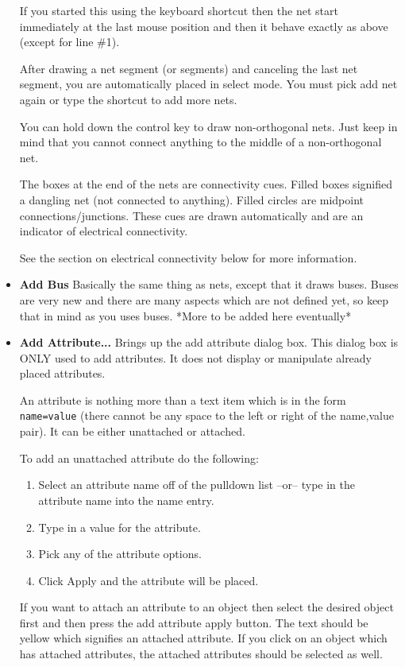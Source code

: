 \documentclass{article}
\begin{document}
\begin{itemize}
If you started this using the keyboard shortcut then the net start
immediately at the last mouse position and then it behave exactly as
above (except for line \#1).

After drawing a net segment (or segments) and canceling the last net
segment, you are automatically placed in select mode.  You must pick
add net again or type the shortcut to add more nets.

You can hold down the control key to draw non-orthogonal nets.  Just
keep in mind that you cannot connect anything to the middle of a
non-orthogonal net.

The boxes at the end of the nets are connectivity cues.  Filled boxes
signified a dangling net (not connected to anything).  Filled circles
are midpoint connections/junctions.  These cues are drawn
automatically and are an indicator of electrical connectivity.

See the section on electrical connectivity below for more information.

\item {\bf Add Bus} Basically the same thing as nets, except that it
  draws buses.  Buses are very new and there are many aspects which
  are not defined yet, so keep that in mind as you uses buses.  *More
  to be added here eventually*
  
\item {\bf Add Attribute...}  Brings up the add attribute dialog box.
  This dialog box is ONLY used to add attributes.  It does not display
  or manipulate already placed attributes.
  
  An attribute is nothing more than a text item which is in the form
  {\tt name=value} (there cannot be any space to the left or right of the
  name,value pair).  It can be either unattached or attached.

 To add an unattached attribute do the following:

 \begin{enumerate}
 \item Select an attribute name off of the pulldown list --or-- type
   in the attribute name into the name entry.
 \item Type in a value for the attribute.
 \item Pick any of the attribute options.
 \item Click Apply and the attribute will be placed.
 \end{enumerate}
 
 If you want to attach an attribute to an object then select the
 desired object first and then press the add attribute apply button.
 The text should be yellow which signifies an attached attribute.  If
 you click on an object which has attached attributes, the attached
 attributes should be selected as well.
 

\end{itemize}
\end{document}
